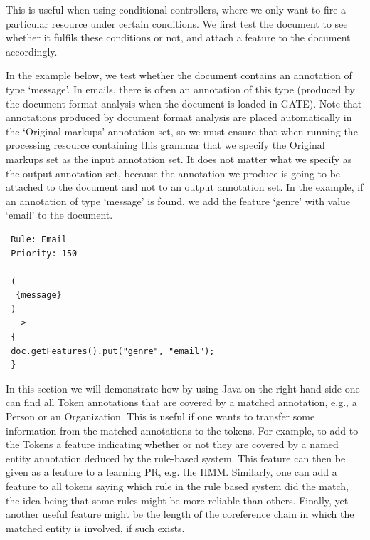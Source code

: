 

This is useful when using conditional controllers, where we only want to fire
a particular resource under certain conditions. We first test the
document to see whether it fulfils these conditions or not, and attach
a feature to the document accordingly. 

In the example below, we test whether the document contains an 
annotation of type `message'. In emails, there is often an annotation
of this type (produced by the document format analysis when the
document is loaded in GATE). Note that annotations produced by
document format analysis are placed automatically in the `Original
markups' annotation set, so we must ensure that when running the
processing resource containing this grammar that we specify the
Original markups set as the input annotation set. It does not matter
what we specify as the output annotation set, because the annotation
we produce is going to be attached to the document and not to an
output annotation set. In the example, if an annotation of type
`message' is found, we add the feature `genre' with value `email' to
the document.

\begin{small}
\begin{verbatim}
 Rule: Email  
 Priority: 150  
  
 (  
  {message}  
 )  
 -->  
 {  
 doc.getFeatures().put("genre", "email");  
 } 
\end{verbatim}
\end{small}



In this section we will demonstrate how by using Java on the
right-hand side one can find all Token annotations that are
covered by a matched annotation, e.g., a Person or an
Organization. This is useful if one wants to transfer some
information from the matched annotations to the tokens. For
example, to add to the Tokens a feature indicating whether or not
they are covered by a named entity annotation deduced by the
rule-based system. This feature can then be given as a feature to
a learning PR, e.g. the HMM. Similarly, one can add a feature to
all tokens saying which rule in the rule based system did the
match, the idea being that some rules might be more reliable than
others. Finally, yet another useful feature might be the length of
the coreference chain in which the matched entity is involved, if
such exists. 

